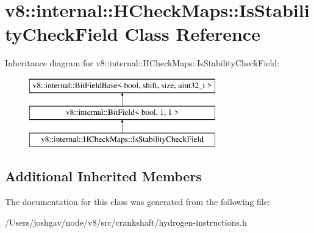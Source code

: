 \hypertarget{classv8_1_1internal_1_1_h_check_maps_1_1_is_stability_check_field}{}\section{v8\+:\+:internal\+:\+:H\+Check\+Maps\+:\+:Is\+Stability\+Check\+Field Class Reference}
\label{classv8_1_1internal_1_1_h_check_maps_1_1_is_stability_check_field}
Inheritance diagram for v8\+:\+:internal\+:\+:H\+Check\+Maps\+:\+:Is\+Stability\+Check\+Field\+:\begin{figure}[H]
\begin{center}
\leavevmode
\includegraphics[height=3.000000cm]{classv8_1_1internal_1_1_h_check_maps_1_1_is_stability_check_field}
\end{center}
\end{figure}
\subsection*{Additional Inherited Members}


The documentation for this class was generated from the following file\+:\begin{DoxyCompactItemize}
\item 
/\+Users/joshgav/node/v8/src/crankshaft/hydrogen-\/instructions.\+h\end{DoxyCompactItemize}
